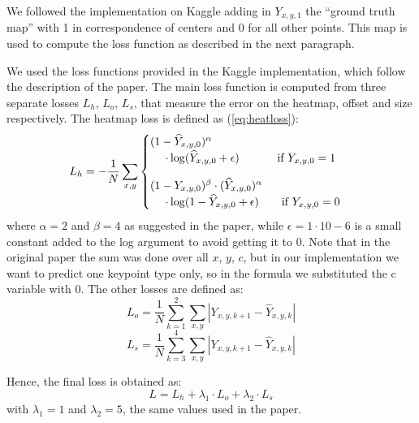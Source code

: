 We followed the implementation on Kaggle adding in $Y_{x,y,1}$ the “ground truth map” with 1 in correspondence of centers and 0 for all other points. This map is used to compute the loss function as described in the next paragraph.

\label{ssssec:lossfunctiondet}

We used the loss functions provided in the Kaggle implementation, which follow the description of the paper. The main loss function is computed from three separate losses $L_h$, $L_o$, $L_s$, that measure the error on the heatmap, offset and size respectively. The heatmap loss is defined as (\ref{eq:heatloss}):
\begin{equation}\label{eq:heatloss}
L_h=-\dfrac{1}{N}\sum_{x,y}
\begin{cases}
(1-\widehat{Y}_{x,y,0})^{\alpha} \\~~~~\cdot \log(\widehat{Y}_{x,y,0} + \epsilon)~~~~~~~~~~\text{if}~Y_{x,y,0} = 1 \vspace*{10pt} \\
(1-Y_{x,y,0})^{\beta} \cdot (\widehat{Y}_{x,y,0})^\alpha \\ ~~~~\cdot \log(1-\widehat{Y}_{x,y,0} + \epsilon) ~~~~~~\text{if}~Y_{x,y,0}=0
\end{cases}
\end{equation}
where $\alpha=2$ and $\beta=4$ as suggested in the paper, while $\epsilon=1 \cdot 10-6$ is a small constant added to the log argument to avoid getting it to 0. Note that in the original paper the sum was done over all $x$, $y$, $c$, but in our implementation we want to predict one keypoint type only, so in the formula we substituted the c variable with 0.
The other losses are defined as:
\begin{equation}
L_o = \dfrac{1}{N}\sum_{k=1}^{2}\sum_{x,y}\left|Y_{x,y,k+1} - \widehat{Y}_{x,y,k}\right|
\end{equation}
\begin{equation}
	L_s = \dfrac{1}{N}\sum_{k=3}^{4}\sum_{x,y}\left|Y_{x,y,k+1} - \widehat{Y}_{x,y,k}\right|
\end{equation}

\noindent Hence, the final loss is obtained as:
\begin{equation}
	L=L_h+ \lambda_1 \cdot L_o+ \lambda_2 \cdot L_s
\end{equation}
with $\lambda_1=1$ and $\lambda_2=5$, the same values used in the paper.

\label{ssssec:networkarchitecturedet}

